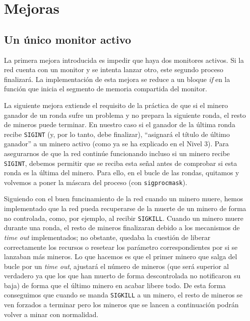 \documentclass{article}
\begin{document}
\section*{Mejoras}

\subsection*{Un único monitor activo}
La primera mejora introducida es impedir que haya dos monitores activos. Si la red cuenta con un monitor y se intenta lanzar otro, este segundo proceso finalizará. La implementación de esta mejora se reduce a un bloque \emph{if} en la función que inicia el segmento de memoria compartida del monitor.

La siguiente mejora extiende el requisito de la práctica de que si el minero ganador de un ronda sufre un problema y no prepara la siguiente ronda, el resto de mineros puede terminar. En nuestro caso si el ganador de la última ronda recibe \texttt{SIGINT} (y, por lo tanto, debe finalizar), ``asignará el título de último ganador'' a un minero activo (como ya se ha explicado en el Nivel 3). Para asegurarnos de que la red continúe funcionando incluso si un minero recibe \texttt{SIGINT}, debemos permitir que se reciba esta señal antes de comprobar si esta ronda es la última del minero. Para ello, en el bucle de las rondas, quitamos y volvemos a poner la máscara del proceso (con \texttt{sigprocmask}). 

Siguiendo con el buen funcinamiento de la red cuando un minero muere, hemos implementado que la red pueda recuperarse de la muerte de un minero de forma no controlada, como, por ejemplo, al recibir \texttt{SIGKILL}. Cuando un minero muere durante una ronda, el resto de mineros finalizaran debido a los mecanismos de \textit{time out} implementados; no obstante, quedaba la cuestión de liberar correctamente los recursos o resetear los parámetro correspondientes por si se lanzaban más mineros. Lo que hacemos es que el primer minero que salga del bucle por un \textit{time out}, ajustará el número de mineros (que será superior al verdadero ya que los que han muerto de forma descontrolada no notificaron su baja) de forma que el último minero en acabar libere todo. De esta forma conseguimos que cuando se manda \texttt{SIGKILL} a un minero, el resto de mineros se ven forzados a terminar pero los mineros que se lancen a continuación podrán volver a minar con normalidad.
\end{document}

